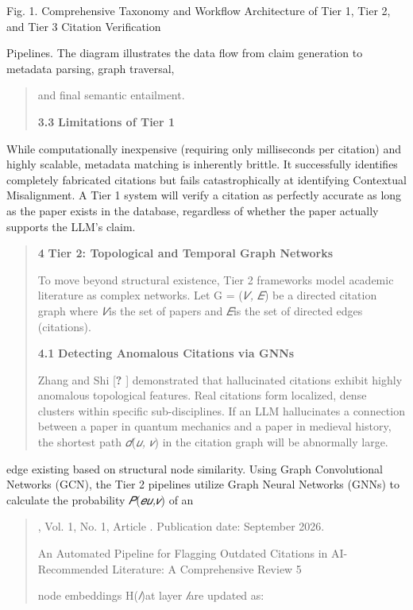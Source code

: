 \documentclass[
]{article}
\begin{document}
Fig. 1. Comprehensive Taxonomy and Workflow Architecture of Tier 1, Tier
2, and Tier 3 Citation Verification

Pipelines. The diagram illustrates the data flow from claim generation
to metadata parsing, graph traversal,

\begin{quote}
and final semantic entailment.

\textbf{3.3} \textbf{Limitations of Tier 1}
\end{quote}

While computationally inexpensive (requiring only milliseconds per
citation) and highly scalable, metadata matching is inherently brittle.
It successfully identifies completely fabricated citations but fails
catastrophically at identifying Contextual Misalignment. A Tier 1 system
will verify a citation as perfectly accurate as long as the paper exists
in the database, regardless of whether the paper actually supports the
LLM's claim.

\begin{quote}
\textbf{4} \textbf{Tier 2: Topological and Temporal Graph Networks}

To move beyond structural existence, Tier 2 frameworks model academic
literature as complex networks. Let G = (\emph{𝑉, 𝐸}) be a directed
citation graph where \emph{𝑉}is the set of papers and \emph{𝐸}is the set
of directed edges (citations).

\textbf{4.1} \textbf{Detecting Anomalous Citations via GNNs}

Zhang and Shi {[}\textbf{?} {]} demonstrated that hallucinated citations
exhibit highly anomalous topological features. Real citations form
localized, dense clusters within specific sub-disciplines. If an LLM
hallucinates a connection between a paper in quantum mechanics and a
paper in medieval history, the shortest path \emph{𝑑}(\emph{𝑢, 𝑣}) in
the citation graph will be abnormally large.
\end{quote}

edge existing based on structural node similarity. Using Graph
Convolutional Networks (GCN), the Tier 2 pipelines utilize Graph Neural
Networks (GNNs) to calculate the probability \emph{𝑃}(\emph{𝑒𝑢,𝑣}) of an

\begin{quote}
, Vol. 1, No. 1, Article . Publication date: September 2026.

An Automated Pipeline for Flagging Outdated Citations in AI-Recommended
Literature: A Comprehensive Review 5

node embeddings H(\emph{𝑙})at layer \emph{𝑙}are updated as:
\end{quote}
\end{document}
